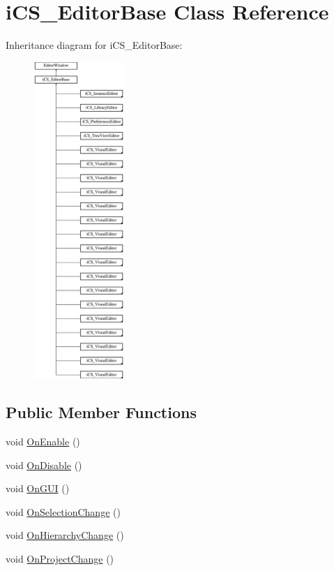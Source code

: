 \hypertarget{classi_c_s___editor_base}{\section{i\+C\+S\+\_\+\+Editor\+Base Class Reference}
\label{classi_c_s___editor_base}
}
Inheritance diagram for i\+C\+S\+\_\+\+Editor\+Base\+:\begin{figure}[H]
\begin{center}
\leavevmode
\includegraphics[height=12.000000cm]{classi_c_s___editor_base}
\end{center}
\end{figure}
\subsection*{Public Member Functions}
\begin{DoxyCompactItemize}
\item 
void \hyperlink{classi_c_s___editor_base_aba46d26800049d76225e2f82819d0744}{On\+Enable} ()
\item 
void \hyperlink{classi_c_s___editor_base_ae10cb6c8d15a246479e3295603589a93}{On\+Disable} ()
\item 
void \hyperlink{classi_c_s___editor_base_a08b9fe09d9890d5f991c1796dceca608}{On\+G\+U\+I} ()
\item 
void \hyperlink{classi_c_s___editor_base_a7df0ff3a6956583bfdc76d2e564b2106}{On\+Selection\+Change} ()
\item 
void \hyperlink{classi_c_s___editor_base_af66f160849b5dea181356e667d8b77d2}{On\+Hierarchy\+Change} ()
\item 
void \hyperlink{classi_c_s___editor_base_a9aa3a0acdc53c5a2833f4c668b55d3e4}{On\+Project\+Change} ()
\end{DoxyCompactItemize}
